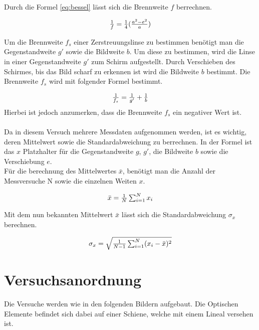 \documentclass[12pt,a4paper,twoside]{article}
\begin{document}
\noindent
Durch die Formel \ref{eq:bessel} lässt sich die Brennweite $f$ berrechnen. 

\begin{equation}
    \label{eq:bessel}
    \centerline{$\frac{1}{f}=\frac{1}{4} (\frac{a^2 - e^2}{a})$}
\end{equation}

\noindent
Um die Brennweite $f_s$ einer Zerstreuungslinse zu bestimmen benötigt man die Gegenstandweite $g'$ sowie die Bildweite $b$. 
Um diese zu bestimmen, wird die Linse in einer Gegenstandweite $g'$ zum Schirm aufgestellt. Durch Verschieben des Schirmes, bis das Bild scharf zu erkennen ist wird die Bildweite $b$ bestimmt. Die Brennweite $f_s$ wird mit folgender Formel bestimmt. 

\begin{equation}
    \label{eq:Zerstreuungslinse}
    \centerline{$\frac{1}{f_s}=\frac{1}{g'} + \frac{1}{b}$}
\end{equation}
\noindent
Hierbei ist jedoch anzumerken, dass die Brennweite $f_s$ ein negativer Wert ist. 
\\
\\
Da in diesem Versuch mehrere Messdaten aufgenommen werden, ist es wichtig, deren Mittelwert sowie die Standardabweichung zu berrechnen. 
In der Formel ist das $x$ Platzhalter für die Gegenstandweite $g$, $g'$, die Bildweite $b$ sowie die Verschiebung $e$. 
\\
Für die berechnung des Mittelwertes $\bar{x}$, benötigt man die Anzahl der Messversuche N sowie die einzelnen Weiten $x$. 

\begin{equation}
    \label{eq:Mittelwert}
    \centerline{$\bar{x} = \frac{1}{N} \sum_{i = 1}^{N} x_i $} 
\end{equation}

\noindent
Mit dem nun bekannten Mittelwert $\bar{x}$ lässt sich die Standardabweichung $\sigma_{x}$ berechnen. 

\begin{equation}
    \label{eq:Standardabweichung}
    \centerline{$\sigma_{x} = \sqrt{\frac{1}{N-1} \sum_{i = 1}^{N} (x_i - \bar{x})^2}$} 
\end{equation}
\section{Versuchsanordnung} %
Die Versuche werden wie in den folgenden Bildern aufgebaut. Die Optischen Elemente befindet sich dabei auf einer Schiene, welche mit einem Lineal versehen ist. 
\end{document}

